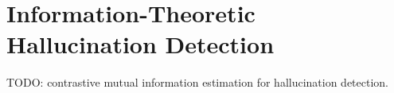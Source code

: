 \chapter{Information-Theoretic Hallucination Detection}
\label{ch:hallucination-detection}

TODO: contrastive mutual information estimation for hallucination detection.
